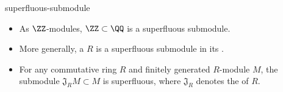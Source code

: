 \begin{example}{superfluous-submodule}
    \begin{itemize}
        \item As $\ZZ$-modules, $\ZZ \subset \QQ$ is a superfluous submodule.
        \item More generally, a  $R$ is a superfluous submodule in its .
        \item For any commutative ring $R$ and finitely generated $R$-module $M$, the submodule $\mathfrak{J}_R M \subset M$ is superfluous, where $\mathfrak{J}_R$ denotes the  of $R$.
    \end{itemize}
\end{example}
